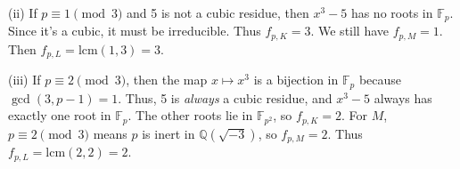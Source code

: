 \begin{solution}
\bigskip

(ii) If $p \equiv 1 \pmod 3$ and 5 is not a cubic residue, then $x^3-5$ has no roots in $\mathbb{F}_p$. Since it's a cubic, it must be irreducible. Thus $f_{p, K} = 3$. We still have $f_{p, M} = 1$. Then $f_{p, L} = \mathrm{lcm}(1, 3) = 3$.

\bigskip

(iii) If $p \equiv 2 \pmod 3$, then the map $x \mapsto x^3$ is a bijection in $\mathbb{F}_p$ because $\gcd(3, p-1) = 1$. Thus, 5 is \textit{always} a cubic residue, and $x^3-5$ always has exactly one root in $\mathbb{F}_p$. The other roots lie in $\mathbb{F}_{p^2}$, so $f_{p, K} = 2$. For $M$, $p \equiv 2 \pmod 3$ means $p$ is inert in $\mathbb{Q}(\sqrt{-3})$, so $f_{p, M} = 2$. Thus $f_{p, L} = \mathrm{lcm}(2, 2) = 2$.
\end{solution}

